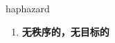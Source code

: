 
\begin{frame}
{\huge haphazard}
\begin{center}
\begin{enumerate}\Large
  \item \textbf{无秩序的，无目标的}
\end{enumerate}
\end{center}
\end{frame}
